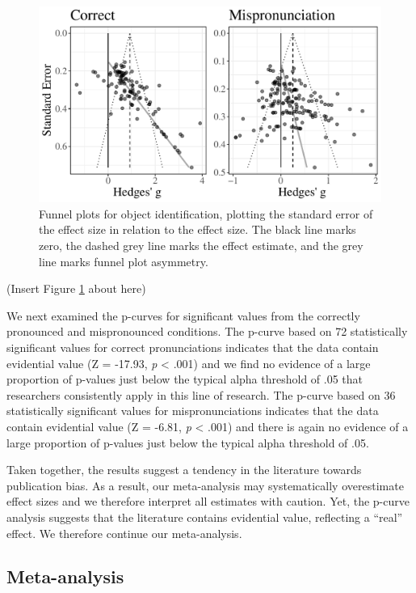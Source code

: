\documentclass[
  man, noextraspace]{apa6}
\begin{document}
\begin{figure}
\centering
\includegraphics{VonHolzenBergmann_MPMetaAnalysis_files/figure-latex/FunnelCombo-1.pdf}
\caption{\label{fig:FunnelCombo}Funnel plots for object identification, plotting the standard error of the effect size in relation to the effect size. The black line marks zero, the dashed grey line marks the effect estimate, and the grey line marks funnel plot asymmetry.}
\end{figure}

(Insert Figure \ref{fig:FunnelCombo} about here)

We next examined the p-curves for significant values from the correctly pronounced and mispronounced conditions. The p-curve based on 72 statistically significant values for correct pronunciations indicates that the data contain evidential value (Z = -17.93, \emph{p} \textless{} .001) and we find no evidence of a large proportion of p-values just below the typical alpha threshold of .05 that researchers consistently apply in this line of research. The p-curve based on 36 statistically significant values for mispronunciations indicates that the data contain evidential value (Z = -6.81, \emph{p} \textless{} .001) and there is again no evidence of a large proportion of p-values just below the typical alpha threshold of .05.

Taken together, the results suggest a tendency in the literature towards publication bias. As a result, our meta-analysis may systematically overestimate effect sizes and we therefore interpret all estimates with caution. Yet, the p-curve analysis suggests that the literature contains evidential value, reflecting a \enquote{real} effect. We therefore continue our meta-analysis.

\hypertarget{meta-analysis-1}{%
\subsection{Meta-analysis}\label{meta-analysis-1}}
\end{document}
